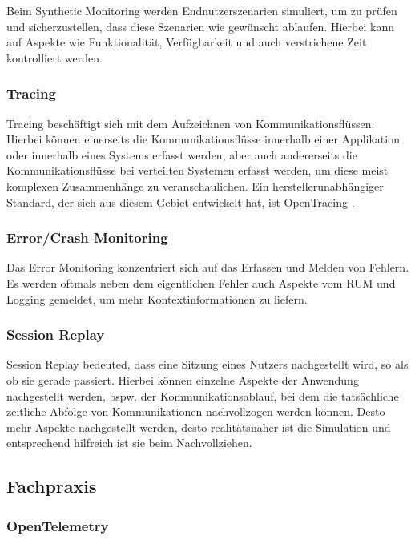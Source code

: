 Beim Synthetic Monitoring werden Endnutzerszenarien simuliert, um zu prüfen und sicherzustellen, dass diese Szenarien wie gewünscht ablaufen. Hierbei kann auf Aspekte wie Funktionalität, Verfügbarkeit und auch verstrichene Zeit kontrolliert werden.

\subsubsection{Tracing}

Tracing beschäftigt sich mit dem Aufzeichnen von Kommunikationsflüssen. Hierbei können einerseits die Kommunikationsflüsse innerhalb einer Applikation oder innerhalb eines Systems erfasst werden, aber auch andererseits die Kommunikationsflüsse bei verteilten Systemen erfasst werden, um diese meist komplexen Zusammenhänge zu veranschaulichen. Ein herstellerunabhängiger Standard, der sich aus diesem Gebiet entwickelt hat, ist OpenTracing \cite{OpenTracing}.

\subsubsection{Error/Crash Monitoring}

Das Error Monitoring konzentriert sich auf das Erfassen und Melden von Fehlern. Es werden oftmals neben dem eigentlichen Fehler auch Aspekte vom RUM und Logging gemeldet, um mehr Kontextinformationen zu liefern.

\subsubsection{Session Replay}

Session Replay bedeuted, dass eine Sitzung eines Nutzers nachgestellt wird, so als ob sie gerade passiert. Hierbei können einzelne Aspekte der Anwendung nachgestellt werden, bspw. der Kommunikationsablauf, bei dem die tatsächliche zeitliche Abfolge von Kommunikationen nachvollzogen werden können. Desto mehr Aspekte nachgestellt werden, desto realitätsnaher ist die Simulation und entsprechend hilfreich ist sie beim Nachvollziehen.

\subsection{Fachpraxis}

\subsubsection{OpenTelemetry}

